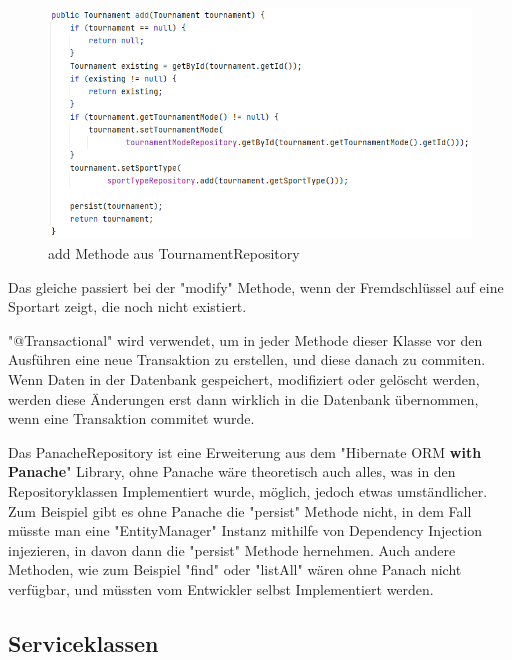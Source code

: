 \begin{figure}[H]
    \includegraphics[scale=0.8]{pics/repository_add_function.png}
    \caption{add Methode aus TournamentRepository}
\end{figure}

Das gleiche passiert bei der "modify" Methode, wenn der Fremdschlüssel auf eine Sportart zeigt, die noch nicht existiert.

"@Transactional" wird verwendet, um in jeder Methode dieser Klasse vor den Ausführen eine neue Transaktion zu erstellen, und diese danach zu commiten. 
Wenn Daten in der Datenbank gespeichert, modifiziert oder gelöscht werden, werden diese Änderungen erst dann wirklich in die Datenbank übernommen, wenn eine Transaktion commitet wurde.

Das PanacheRepository ist eine Erweiterung aus dem "Hibernate ORM \textbf{with Panache}" Library, ohne Panache wäre theoretisch auch alles, was in den Repositoryklassen Implementiert wurde, möglich, jedoch etwas umständlicher.
Zum Beispiel gibt es ohne Panache die "persist" Methode nicht, in dem Fall müsste man eine "EntityManager" Instanz mithilfe von Dependency Injection injezieren, in davon dann die "persist" Methode hernehmen.
Auch andere Methoden, wie zum Beispiel "find" oder "listAll" wären ohne Panach nicht verfügbar, und müssten vom Entwickler selbst Implementiert werden.

\subsection{Serviceklassen}

